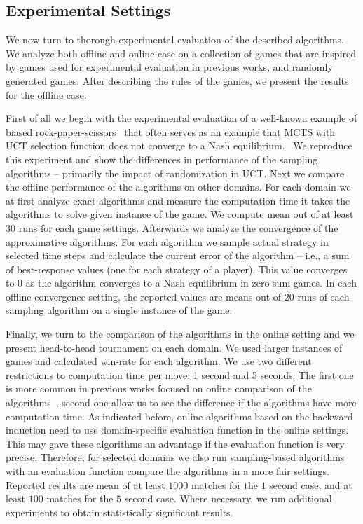 \subsection{Experimental Settings}
We now turn to thorough experimental evaluation of the described algorithms.
We analyze both offline and online case on a collection of games that are inspired by games used for experimental evaluation in previous works, and randomly generated games.
After describing the rules of the games, we present the results for the offline case. 

First of all we begin with the experimental evaluation of a well-known example of biased rock-paper-scissors~\cite{Shafiei09} that often serves as an example that MCTS with UCT selection function does not converge to a Nash equilibrium.~ 
We reproduce this experiment and show the differences in performance of the sampling algorithms -- primarily the impact of randomization in UCT.
Next we compare the offline performance of the algorithms on other domains.
For each domain we at first analyze exact algorithms and measure the computation time it takes the algorithms to solve given instance of the game. 
We compute mean out of at least $30$ runs for each game settings. 
Afterwards we analyze the convergence of the approximative algorithms.
For each algorithm we sample actual strategy in selected time steps and calculate the current error of the algorithm -- i.e., a sum of best-response values (one for each strategy of a player).
This value converges to $0$ as the algorithm converges to a Nash equilibrium in zero-sum games.
In each offline convergence setting, the reported values are means out of $20$ runs of each sampling algorithm on a single instance of the game.

Finally, we turn to the comparison of the algorithms in the online setting and we present head-to-head tournament on each domain.
We used larger instances of games and calculated win-rate for each algorithm.
We use two different restrictions to computation time per move: 1 second and 5 seconds. 
The first one is more common in previous works focused on online comparison of the algorithms~\cite{XXX}, second one allow us to see the difference if the algorithms have more computation time.
As indicated before, online algorithms based on the backward induction need to use domain-specific evaluation function in the online settings.
This may gave these algorithms an advantage if the evaluation function is very precise.
Therefore, for selected domains we also run sampling-based algorithms with an evaluation function compare the algorithms in a more fair settings.
Reported results are mean of at least $1000$ matches for the $1$ second case, and at least $100$ matches for the $5$ second case.
Where necessary, we run additional experiments to obtain statistically significant results.


